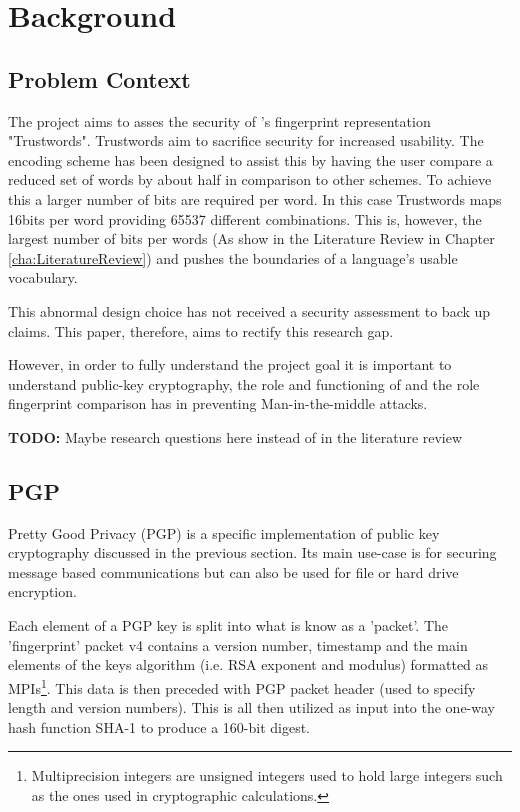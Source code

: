 \chapter{Background}
\label{cha:Background}

\section{Problem Context}
The project aims to asses the security of \pep's fingerprint representation "Trustwords". Trustwords aim to sacrifice security for increased usability. The encoding scheme has been designed to assist this by having  the user compare a reduced set of words by about half in comparison to other schemes. To achieve this a larger number of bits are required per word. In this case Trustwords maps 16bits per word providing 65537 different combinations. This is, however, the largest number of bits per words (As show in the Literature Review in Chapter \ref{cha:LiteratureReview}) and pushes the boundaries of a language's usable vocabulary.

This abnormal design choice has not received a security assessment to back up claims. This paper, therefore, aims to rectify this research gap.

However, in order to fully understand the project goal it is important to understand public-key cryptography, the role and functioning of \pep and the role fingerprint comparison has in preventing Man-in-the-middle attacks.

\textbf{TODO:} Maybe research questions here instead of in the literature review

\section{PGP}
Pretty Good Privacy (PGP) is a specific implementation of public key cryptography discussed in the previous section. Its main use-case is for securing message based communications but can also be used for file or hard drive encryption.

Each element of a PGP key is split into what is know as a 'packet'. The 'fingerprint' packet v4 contains a version number, timestamp and the main elements of the keys algorithm (i.e. RSA exponent and modulus) formatted as MPIs\footnote{Multiprecision integers are unsigned integers used to hold large integers such as the ones used in cryptographic calculations.}. This data is then preceded with PGP packet header (used to specify length and version numbers). This is all then utilized as input into the one-way hash function SHA-1 to produce a 160-bit digest.

